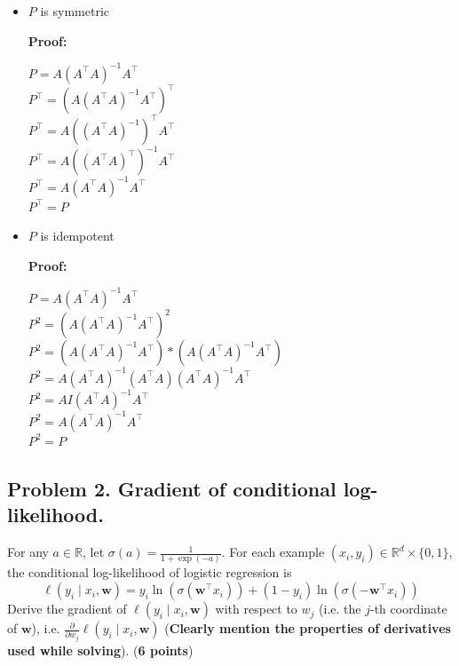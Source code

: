 \documentclass[11pt]{scrartcl}
\newcommand{\bw}{\mathbf{w}}
\begin{document}
	\begin{itemize}
		\item $P$ is symmetric
		
		\textbf{Proof:}
		
		$P = A (A^\intercal A)^{-1} A^\intercal$\\
		$P^\intercal = \left(A (A^\intercal A)^{-1} A^\intercal\right)^\intercal$\\
		$P^\intercal = A \left((A^\intercal A)^{-1}\right)^\intercal A^\intercal$\\
		$P^\intercal = A \left((A^\intercal A)^\intercal\right)^{-1} A^\intercal$\\
		$P^\intercal = A (A^\intercal A)^{-1} A^\intercal$\\
		$P^\intercal = P$\\
		
		\item $P$ is idempotent
		
		\textbf{Proof:}
		
		$P = A (A^\intercal A)^{-1} A^\intercal$\\
		$P^2 = \left(A (A^\intercal A)^{-1} A^\intercal\right)^2$\\
		$P^2 = \left(A (A^\intercal A)^{-1} A^\intercal\right) * \left(A (A^\intercal A)^{-1} A^\intercal\right)$\\
		$P^2 = A (A^\intercal A)^{-1} (A^\intercal A) (A^\intercal A)^{-1} A^\intercal $\\
		$P^2 = A I (A^\intercal A)^{-1} A^\intercal $\\
		$P^2 = A (A^\intercal A)^{-1} A^\intercal $\\
		$P^2 = P$
	\end{itemize}
	
	
	
	
	
	
	\subsection*{Problem 2. Gradient of conditional log-likelihood.}
	For any $a\in \mathbb{R}$, let  $\sigma(a) = \frac{1}{1 +\exp(-a)}$.
	For each example $(x_i, y_i)\in \mathbb{R}^d \times \{0, 1\}$, the conditional log-likelihood of logistic regression is
	\[
	\ell(y_i \mid x_i, \bw) = y_i \ln(\sigma(\bw^\intercal x_i)) + (1 - y_i)\ln(\sigma(-\bw^\intercal x_i))
	\]
	Derive the gradient of $\ell(y_i\mid x_i, \bw)$ with respect to $w_j$ (i.e. the $j$-th coordinate of $\bw$), i.e. $\frac{\partial }{\partial w_j}\ell(y_i \mid x_i, \bw)$  (\textbf{Clearly mention the properties of derivatives used while solving}). (\textbf{6 points})
	
\end{document}
